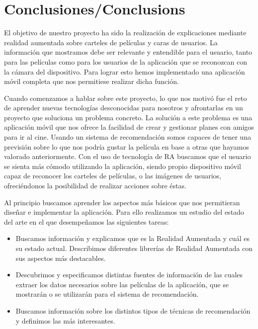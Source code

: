 
\cleardoublepage


\chapter{Conclusiones/Conclusions}
\label{makereference5}

El objetivo de nuestro proyecto ha sido la realización de explicaciones mediante realidad aumentada sobre 
carteles de películas y caras de usuarios. La información que mostramos debe ser relevante y entendible para el 
usuario, tanto para las películas como para los usuarios de la aplicación que se reconozcan con la cámara del dispositivo. 
Para lograr esto hemos implementado una aplicación móvil completa que nos permitiese realizar dicha función.

Cuando comenzamos a hablar sobre este proyecto, lo que nos motivó fue el
 reto de aprender nuevas tecnologías desconocidas para nosotros y afrontarlas
 en un proyecto que soluciona un problema concreto. La solución a este problema
 es una aplicación móvil que nos ofrece la facilidad de crear y gestionar
 planes con amigos para ir al cine. Usando un sistema de recomendación somos
 capaces de tener una previsión sobre lo que nos podría gustar la película en
 base a otras que hayamos valorado anteriormente.
 Con el uso de tecnología de RA buscamos que el usuario se sienta más cómodo
 utilizando la aplicación, siendo 
 propio dispositivo móvil capaz de reconocer los carteles de películas, o las
 imágenes de usuarios, ofreciéndonos la posibilidad de realizar acciones sobre éstas.

Al principio buscamos aprender los aspectos más básicos que nos permitieran
 diseñar e implementar la aplicación. Para ello realizamos un estudio
 del estado del arte en el que desempeñamos las siguientes tareas:
\begin{itemize}  
    \item Buscamos información y explicamos que es la Realidad Aumentada y cuál
     es su estado actual. Describimos diferentes librerías de Realidad Aumentada
     con sus aspectos más destacables.
    \item Descubrimos y especificamos distintas fuentes de información de las
     cuales extraer los datos necesarios sobre las películas de la aplicación,
     que se mostrarán o se utilizarán para el sistema de recomendación.
    \item Buscamos información sobre los distintos tipos de técnicas de
     recomendación y definimos las más interesantes.
\end{itemize}

